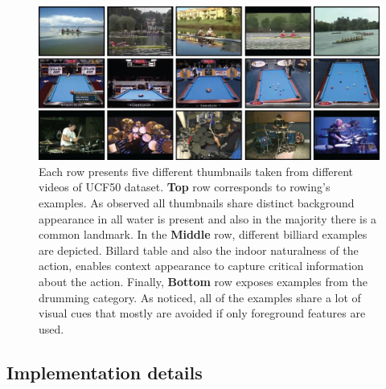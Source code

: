 \begin{figure}[t!]
\begin{center}
\includegraphics[width=0.98\linewidth]{fig/sift.png}
\end{center}
\caption{Each row presents five different thumbnails taken from different videos of UCF50 dataset. \textbf{Top} row corresponds to rowing's examples. As observed all thumbnails share distinct background appearance \ie in all water is present and also in the majority there is a common landmark. In the \textbf{Middle} row, different billiard examples are depicted. Billard table and also the indoor naturalness of the action, enables context appearance to capture critical information about the action. Finally, \textbf{Bottom} row exposes examples from the drumming category. As noticed, all of the examples share a lot of visual cues that mostly are avoided if only foreground features are used.}
\label{fig:sift_example}
\end{figure}



\subsection{Implementation details}

